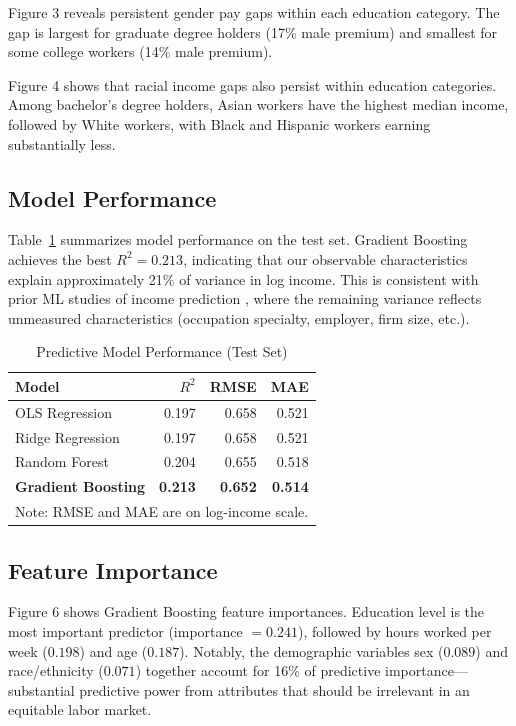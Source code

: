 \documentclass[11pt]{article}
\begin{document}
Figure 3 reveals persistent gender pay gaps within each education category.
The gap is largest for graduate degree holders (17\% male premium) and
smallest for some college workers (14\% male premium).

Figure 4 shows that racial income gaps also persist within education
categories. Among bachelor's degree holders, Asian workers have the highest
median income, followed by White workers, with Black and Hispanic workers
earning substantially less.

\subsection{Model Performance}

Table~\ref{tab:models} summarizes model performance on the test set. Gradient
Boosting achieves the best $R^2 = 0.213$, indicating that our observable
characteristics explain approximately 21\% of variance in log income. This is
consistent with prior ML studies of income prediction \citep{ding2021retiring},
where the remaining variance reflects unmeasured characteristics (occupation
specialty, employer, firm size, etc.).

\begin{table}[h!]
\centering
\caption{Predictive Model Performance (Test Set)}
\label{tab:models}
\begin{tabular}{lrrr}
\toprule
Model & $R^2$ & RMSE & MAE \\
\midrule
OLS Regression & 0.197 & 0.658 & 0.521 \\
Ridge Regression & 0.197 & 0.658 & 0.521 \\
Random Forest & 0.204 & 0.655 & 0.518 \\
\textbf{Gradient Boosting} & \textbf{0.213} & \textbf{0.652} & \textbf{0.514} \\
\bottomrule
\multicolumn{4}{l}{\small Note: RMSE and MAE are on log-income scale.}
\end{tabular}
\end{table}

\subsection{Feature Importance}

Figure 6 shows Gradient Boosting feature importances. Education level is the
most important predictor (importance $= 0.241$), followed by hours worked per
week ($0.198$) and age ($0.187$). Notably, the demographic variables sex
($0.089$) and race/ethnicity ($0.071$) together account for 16\% of predictive
importance---substantial predictive power from attributes that should be
irrelevant in an equitable labor market.
\end{document}
